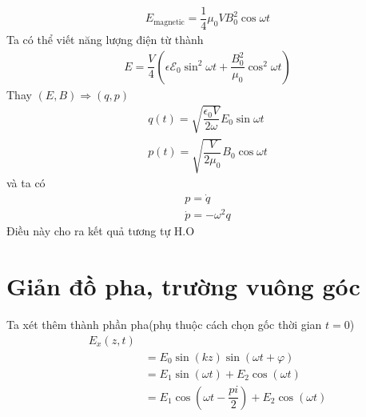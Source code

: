 \documentclass{report}
\newcommand{\f}[2]{\dfrac{#1}{#2}}
\begin{document}
\begin{gather}
	E_{\text{magnetic}} = \f{1}{4} \mu_{0} V B_{0}^{2} \cos \omega t
\end{gather}
Ta có thể viết năng lượng điện từ thành
\begin{gather}
	E = \f{V}{4} (\epsilon \mathcal{E}_{0} \sin^{2} \omega t + \f{ B_{0}^{2} }{ \mu_{0} } \cos^{2} \omega t )
\end{gather}
Thay $(E,B) \Rightarrow (q,p)$
\begin{gather}
	q(t) = \sqrt{\f{\epsilon_{0} V}{2\omega}} E_{0} \sin \omega t\\
	p(t) = \sqrt{\f{V}{2 \mu_{0} }} B_{0} \cos \omega t
\end{gather}
và ta có
\begin{gather}
	p = \dot{q}\\
	\dot{p} = - \omega^{2} q
\end{gather}
Điều này cho ra kết quả tương tự H.O
\section{Giản đồ pha, trường vuông góc}
Ta xét thêm thành phần pha(phụ thuộc cách chọn gốc thời gian $t=0$)
\begin{equation}
	\begin{aligned}
		E_{x}(z,t)\\
		&= E_{0} \sin(kz) \sin(\omega t + \varphi)\\
		&= E_{1} \sin(\omega t) + E_{2} \cos(\omega t)\\
		&= E_{1} \cos(\omega t - \f{pi}{2}) + E_{2} \cos(\omega t)
	\end{aligned}
\end{equation}
\end{document}
